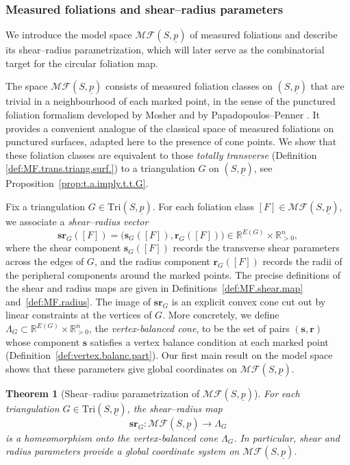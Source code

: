 \documentclass[11pt, letterpaper]{amsart}
\newtheorem{theorem}{\rm\bf Theorem}[section]
\theoremstyle{definition}
\theoremstyle{remark}
\newcommand{\up}{\underline{p}}
\newcommand{\Sp}{(S,\up)}
\newcommand{\TSp}{\text{Tri}\Sp}
\newcommand{\cMFp}{\mathcal{MF} (S,\up)}
\newcommand{\bR}{\mathbb{R}}
\numberwithin{equation}{section}
\begin{document}
\subsubsection{Measured foliations and shear--radius parameters}
\label{subsubsec:intro.MF.shear-radius}

We introduce the model space \(\cMFp\) of measured foliations and describe its shear--radius parametrization, which will later serve as the combinatorial target for the circular foliation map. 

The space \(\cMFp\) consists of measured foliation classes on \(\Sp\) that are trivial in a neighbourhood of each marked point, in the sense of the punctured foliation formalism developed by Mosher \cite{Mos88} and by Papadopoulos--Penner \cite{PP93}.
It provides a convenient analogue of the classical space of measured foliations on punctured surfaces, adapted here to the presence of cone points. 
We show that these foliation classes are equivalent to those {\em totally transverse} (Definition \ref{def:MF.trans.triang.surf.}) to a triangulation $G$ on $\Sp$, see Proposition~\ref{prop:t.a.imply.t.t.G}.

Fix a triangulation \(G \in \TSp\). For each foliation class \([F] \in \cMFp\), we associate a \emph{shear--radius vector}
\[
  \mathbf{sr}_G([F]) = \bigl(\mathbf{s}_G([F]), \mathbf{r}_G([F])\bigr) \in \bR^{E(G)} \times \bR^n_{>0},
\]
where the shear component \(\mathbf{s}_G([F])\) records the transverse shear parameters across the edges of \(G\), and the radius component \(\mathbf{r}_G([F])\) records the radii of the peripheral components around the marked points.
The precise definitions of the shear and radius maps are given in Definitions~\ref{def:MF.shear.map} and~\ref{def:MF.radius}. 
The image of \(\mathbf{sr}_G\) is an explicit convex cone cut out by linear constraints at the vertices of \(G\).
More concretely, we define \(\Lambda_G \subset \bR^{E(G)} \times \bR^n_{>0}\), the \emph{vertex-balanced cone}, to be the set of pairs \((\mathbf{s},\mathbf{r})\) whose component \(\mathbf{s}\) satisfies a vertex balance condition at each marked point (Definition~\ref{def:vertex.balanc.part}).
Our first main result on the model space shows that these parameters give global coordinates on \(\cMFp\).

\begin{theorem}[Shear--radius parametrization of \texorpdfstring{\(\cMFp\)}{MF(S,\underline{p})}]
\label{thm:homeo.MFp.shear.radius}
For each triangulation \(G \in \TSp\), the shear--radius map
\[
  \mathbf{sr}_G : \cMFp \longrightarrow \Lambda_G
\]
is a homeomorphism onto the vertex-balanced cone \(\Lambda_G\).
In particular, shear and radius parameters provide a global coordinate system on \(\cMFp\).
\end{theorem}
\end{document}
